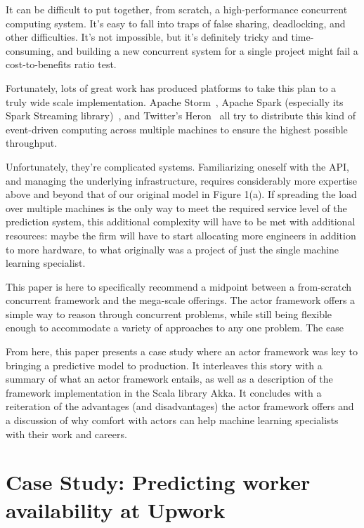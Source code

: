 \documentclass{article}
\begin{document}
 It can be difficult to put together, from scratch, a high-performance
concurrent computing system. It's easy to fall into traps of false sharing,
deadlocking, and other difficulties. It's not impossible, but it's definitely
tricky and time-consuming, and building a new concurrent system for a single
project might fail a cost-to-benefits ratio test.

 Fortunately, lots of great work has produced platforms to take this plan to a
truly wide scale implementation. Apache Storm~\cite{apache_storm}, 
Apache Spark (especially its Spark Streaming library)~\cite{apache_spark}, 
and Twitter's Heron~\cite{kulkarni2015heron} all try to distribute this kind of 
event-driven computing across multiple machines to ensure the highest 
possible throughput.

 Unfortunately, they're complicated systems. Familiarizing oneself with the API,
and managing the underlying infrastructure, requires considerably more expertise
above and beyond that of our original model in Figure 1(a). If spreading the
load over multiple machines is the only way to meet the required service level
of the prediction system, this additional complexity will have to be met with
additional resources: maybe the firm will have to start allocating more
engineers in addition to more hardware, to what originally was a project of just
the single machine learning specialist.

 This paper is here to specifically recommend a midpoint between a from-scratch
concurrent framework and the mega-scale offerings. The actor framework offers a
simple way to reason through concurrent problems, while still being flexible
enough to accommodate a variety of approaches to any one problem. The ease

 From here, this paper presents a case study where an actor framework was key to
bringing a predictive model to production. It interleaves this story with a
summary of what an actor framework entails, as well as a description of the
framework implementation in the Scala library Akka. It concludes with a reiteration
of the advantages (and disadvantages) the actor framework offers and a
discussion of why comfort with actors can help machine learning specialists with
their work and careers.

\section{Case Study: Predicting worker availability at Upwork}
\end{document}
